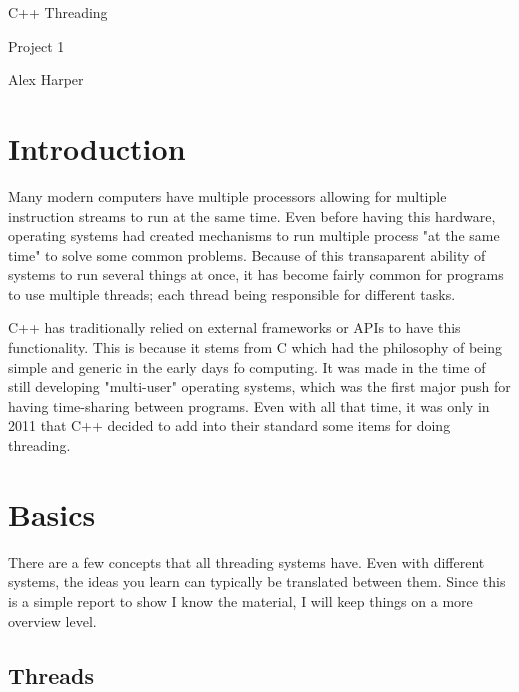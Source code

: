 \documentclass[12pt]{article}
\begin{document}
\begin{titlepage}
	\centering
	{\Huge C++ Threading\par}
	\vspace{0.25in}
	{\Large Project 1\par}
	\vspace{2in}
	{Alex Harper\par}
	\newpage
\end{titlepage}
\tableofcontents
\newpage

\listoffigures
\newpage
\setlength{\parindent}{4em} %
\setlength{\parskip}{1em} %


\section{Introduction}

Many modern computers have multiple processors allowing for multiple instruction streams to run at the same time.
Even before having this hardware, operating systems had created mechanisms to run multiple process "at the same time" to solve some common problems.
Because of this transaparent ability of systems to run several things at once, it has become fairly common for programs to use multiple threads; each thread being responsible for different tasks.

C++ has traditionally relied on external frameworks or APIs to have this functionality.
This is because it stems from C which had the philosophy of being simple and generic in the early days fo computing.
It was made in the time of still developing "multi-user" operating systems, which was the first major push for having time-sharing between programs.
Even with all that time, it was only in 2011 that C++ decided to add into their standard some items for doing threading.

\section{Basics}

There are a few concepts that all threading systems have.
Even with different systems, the ideas you learn can typically be translated between them.
Since this is a simple report to show I know the material, I will keep things on a more overview level.

\subsection{Threads}
\end{document}
